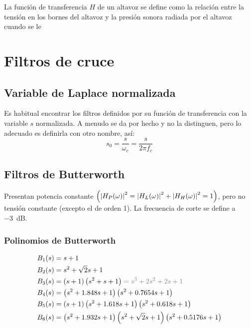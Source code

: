 \documentclass[a4paper, 8pt]{extarticle}
\begin{document}
\begin{multicols}{3}
    La función de transferencia $H$ de un altavoz se define como la relación entre la tensión en los bornes del altavoz y la presión sonora radiada por el altavoz cuando se le

    \vfill\null
    \columnbreak
    \section{Filtros de cruce}
    \subsection{Variable de Laplace normalizada}
    Es habitual encontrar los filtros definidos por su función de transferencia con la variable $s$ normalizada. A menudo se da por hecho y no la distinguen, pero lo adecuado es definirla con otro nombre, así:
    \[s_0 = \frac{s}{\omega_c} = \frac{s}{2 \pi f_c}\]

    \subsection{Filtros de Butterworth}

    Presentan potencia constante $\left( \abs{H_P (\omega)}^2 = \abs{H_L (\omega )}^2 + \abs{H_H (\omega )}^2   = 1\right)$, pero no tensión constante (excepto el de orden 1). La frecuencia de corte se define a \qty{-3}{\dB}.

    \subsubsection{Polinomios de Butterworth}
    \begin{align*}
        B_1(s)  & = s + 1                                                                                             \\
        B_2(s)  & = s^2 + \sqrt{2} s + 1                                                                              \\
        B_3(s)  & =  \left( s+1 \right)\left( s^2 +s+1 \right) \color{gray} = s^3 + 2 s^2 + 2 s + 1 \color{black}     \\
        B_4(s)  & = \left( s^2 +1.848 s +1 \right) \left( s^2 +0.7654s +1 \right)                                     \\
        B_5(s)  & = \left( s + 1 \right) \left( s^2 + 1.618s + 1 \right) \left( s^2 + 0.618s + 1 \right)              \\
        B_6 (s) & = \left( s^2 + 1.932s + 1 \right) \left( s^2 + \sqrt{2}s +1 \right) \left( s^2 +0.5176s + 1 \right)
    \end{align*}


\end{multicols}
\end{document}
